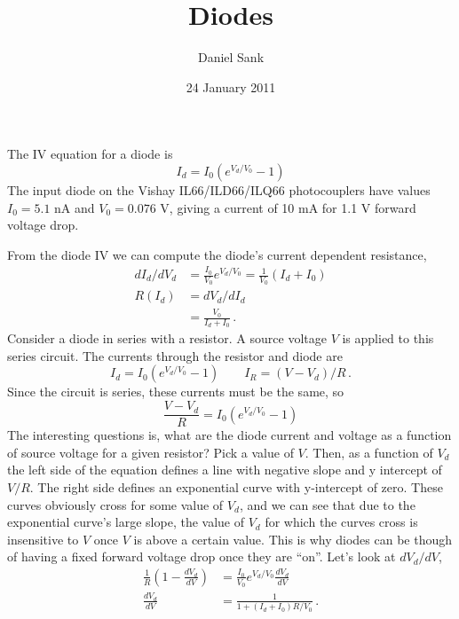 \documentclass{article}
\title{Diodes}
\author{Daniel Sank}
\date{24 January 2011}
\begin{document}
\maketitle

The IV equation for a diode is
\begin{equation}
I_{d}=I_{0}(e^{V_{d}/V_{0}}-1)
\end{equation}
The input diode on the Vishay IL66/ILD66/ILQ66 photocouplers have values $I_{0}=5.1$ nA and $V_{0}=0.076$ V, giving a current of 10 mA for 1.1 V forward voltage drop.

From the diode IV we can compute the diode's current dependent resistance,
\begin{align}
dI_{d}/dV_{d} &= \frac{I_{0}}{V_{0}}e^{V_{d}/V_{0}}=\frac{1}{V_{0}}(I_{d}+I_{0}) \\
R(I_{d}) &= dV_{d}/dI_{d} \\
&= \frac{V_{0}}{I_{d}+I_{0}} \, .
\end{align}
Consider a diode in series with a resistor.
A source voltage $V$ is applied to this series circuit.
The currents through the resistor and diode are
\begin{equation}
I_{d} = I_{0}(e^{V_d / V_0} - 1) \qquad I_R = (V - V_d) / R \, .
\end{equation}
Since the circuit is series, these currents must be the same, so
\begin{equation}
\frac{V - V_d}{R} = I_0 (e^{V_d / V_0} - 1)
\end{equation}
The interesting questions is, what are the diode current and voltage as a function of source voltage for a given resistor?
Pick a value of $V$.
Then, as a function of $V_{d}$ the left side of the equation defines a line with negative slope and y intercept of $V/R$.
The right side defines an exponential curve with y-intercept of zero.
These curves obviously cross for some value of $V_{d}$, and we can see that due to the exponential curve's large slope, the value of $V_{d}$ for which the curves cross is insensitive to $V$ once $V$ is above a certain value.
This is why diodes can be though of having a fixed forward voltage drop once they are ``on''.
Let's look at $dV_d / dV$,
\begin{align}
\frac{1}{R} \left( 1 - \frac{dV_d}{dV} \right) &= \frac{I_0}{V_0} e^{V_d / V_{0}} \frac{dV_d}{dV} \\
\frac{d V_d}{dV} &= \frac{1}{1 + (I_d + I_0) R / V_0} \, .
\end{align}
\end{document}

